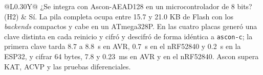 \begin{table}[H]
\begin{tabularx}{\textwidth}{@{}L{0.30\textwidth}Y@{}}
¿Se integra con Ascon-AEAD128 en un microcontrolador de 8 bits? (H2) & Sí. La pila completa ocupa entre 15.7 y 21.0 KB de Flash con los \textit{backends} compactos y cabe en un ATmega328P. En las cuatro placas generó una clave distinta en cada reinicio y cifró y descifró de forma idéntica a \texttt{ascon-c}; la primera clave tarda 8.7 a 8.8~s en AVR, 0.7~s en el nRF52840 y 0.2~s en la ESP32, y cifrar 64 bytes, 7.8 y 0.23~ms en AVR y en el nRF52840. Ascon supera KAT, ACVP y las pruebas diferenciales. \\
\bottomrule
\end{tabularx}
\end{table}
